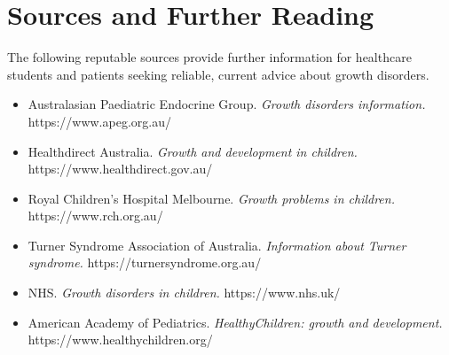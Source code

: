 \section*{Sources and Further Reading}
The following reputable sources provide further information for healthcare students and patients seeking reliable, current advice about growth disorders.

\begin{itemize}
    \item Australasian Paediatric Endocrine Group. \textit{Growth disorders information.} https://www.apeg.org.au/
    \item Healthdirect Australia. \textit{Growth and development in children.} https://www.healthdirect.gov.au/
    \item Royal Children's Hospital Melbourne. \textit{Growth problems in children.} https://www.rch.org.au/
    \item Turner Syndrome Association of Australia. \textit{Information about Turner syndrome.} https://turnersyndrome.org.au/
    \item NHS. \textit{Growth disorders in children.} https://www.nhs.uk/
    \item American Academy of Pediatrics. \textit{HealthyChildren: growth and development.} https://www.healthychildren.org/
\end{itemize}
